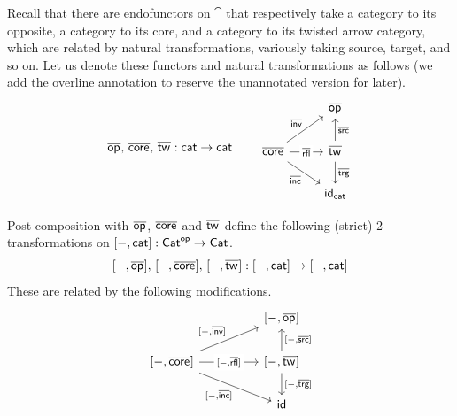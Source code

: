 Recall that there are endofunctors on $\cat$
that respectively take a category to its opposite,
a category to its core,
and a category to its twisted arrow category,
which are related by natural transformations,
variously taking source, target, and so on.
Let us denote these functors and natural transformations as follows
(we add the overline annotation to reserve the
unannotated version for later).
\[
\overline{\vOp{}},\, \overline{\vCore{}}, \, \overline{\vTw{}}
: \cat \to \cat
\quad \quad 
\begin{tikzcd}
  & \overline{\vOp{}} \\
  \overline{\vCore{}} & \overline{\vTw{}} \\
  & {\id_{\cat}}
  \arrow["\overline\inv", from=2-1, to=1-2]
  \arrow["\overline\rfl"{description}, from=2-1, to=2-2]
  \arrow["\overline\inc"', from=2-1, to=3-2]
  \arrow["\overline\src"', from=2-2, to=1-2]
  \arrow["\overline\trg", from=2-2, to=3-2]
\end{tikzcd}
\]

Post-composition with $\overline{\mathop{\mathsf{op}_{}}}$, $\overline{\mathop{\mathsf{core}_{}}}$ and $\overline{\mathop{\mathsf{tw}_{}}}$
define the following (strict) 2-transformations
on $[-,\mathsf{cat}] : \mathsf{Cat}^{\mathsf{op}} \to \mathsf{Cat}$.
\[[-,\overline{\mathop{\mathsf{op}_{}}}],\, [-,\overline{\mathop{\mathsf{core}_{}}}], \, [-,\overline{\mathop{\mathsf{tw}_{}}}] : [-,\mathsf{cat}] \to [-,\mathsf{cat}]\]
These are related by the following modifications.
\[
\begin{tikzcd}[column sep=huge]
  & {[-,\overline{\vOp{}}]} \\
  {[-,\overline{\vCore{}}]} & {[-,\overline{\vTw{}}]} \\
  & {\id}
  \arrow["{[-,\overline\inv]}", from=2-1, to=1-2]
  \arrow["{[-,\overline\rfl]}"{description}, from=2-1, to=2-2]
  \arrow["{[-,\overline\inc]}"', from=2-1, to=3-2]
  \arrow["{[-,\overline\src]}"', from=2-2, to=1-2]
  \arrow["{[-,\overline\trg]}", from=2-2, to=3-2]
\end{tikzcd}
\]

